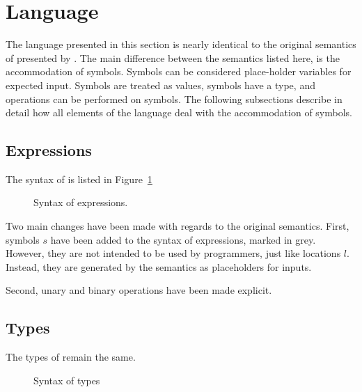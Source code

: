 

\section{Language}
\label{sec:language}

The language presented in this section is nearly identical to the original semantics of \TOPHAT presented by \citet{Steenvoorden2019}.
The main difference between the semantics listed here, is the accommodation of symbols.
Symbols can be considered place-holder variables for expected input.
Symbols are treated as values, symbols have a type, and operations can be performed on symbols.
The following subsections describe in detail how all elements of the \TOPHAT language deal with the accommodation of symbols.


\subsection{Expressions}
\label{expressions}

The syntax of \TOPHAT is listed in Figure~\ref{fig:syntaxtophat}

\begin{figure}




\caption{Syntax of \TOPHAT expressions.}
  \label{fig:syntaxtophat}
\end{figure}

Two main changes have been made with regards to the original \TOPHAT semantics.
First, symbols $s$ have been added to the syntax of expressions, marked in grey.
However, they are not intended to be used by programmers, just like locations $l$.
Instead, they are generated by the semantics as placeholders for inputs.

Second, unary and binary operations have been made explicit.

\subsection{Types}

The types of \TOPHAT remain the same.

\begin{figure}
\caption{Syntax of \TOPHAT types}
  \label{fig:syntaxtypes}
\end{figure}

